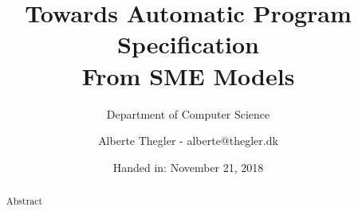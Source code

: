 \documentclass[a4paper]{report}
\author{Alberte Thegler - alberte@thegler.dk}
\title{Towards Automatic Program Specification \\ From SME Models}
\subtitle{Department of Computer Science}
\date{Handed in: November 21, 2018}
\begin{document}
\maketitle

\begin{abstract}
\begin{doublespace}
Abstract
\end{doublespace}
\end{abstract}


\newpage
\tableofcontents

\newpage
{}


%
% 
%
% 

% 
%
% 
%
% 
% 
%
% 
\end{document}
